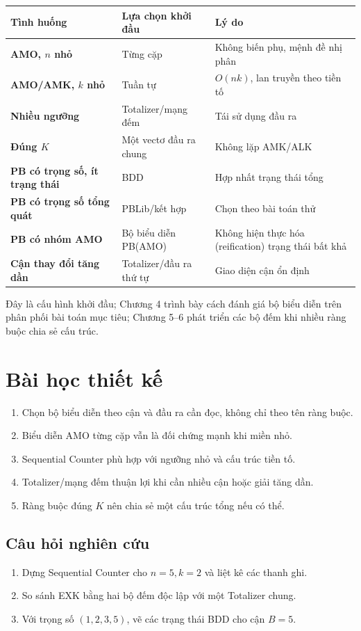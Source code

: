 \begin{center}
\label{tab:cardinality-choice}
\begin{tabularx}{\textwidth}{@{}>{\bfseries\sffamily}p{}YY@{}}
\toprule
Tình huống & Lựa chọn khởi đầu & Lý do\\
\midrule
AMO, \(n\) nhỏ & Từng cặp & Không biến phụ, mệnh đề nhị phân\\
AMO/AMK, \(k\) nhỏ & Tuần tự & \(O(nk)\), lan truyền theo tiền tố\\
Nhiều ngưỡng & Totalizer/mạng đếm & Tái sử dụng đầu ra\\
Đúng \(K\) & Một vectơ đầu ra chung & Không lặp AMK/ALK\\
PB có trọng số, ít trạng thái & BDD & Hợp nhất trạng thái tổng\\
PB có trọng số tổng quát & PBLib/kết hợp & Chọn theo bài toán thử\\
PB có nhóm AMO & Bộ biểu diễn PB(AMO) & Không hiện thực hóa (reification) trạng thái bất khả\\
Cận thay đổi tăng dần & Totalizer/đầu ra thứ tự & Giao diện cận ổn định\\
\bottomrule
\end{tabularx}
\end{center}

Đây là cấu hình khởi đầu; Chương 4 trình bày cách đánh giá bộ biểu diễn trên phân
phối bài toán mục tiêu; Chương 5--6 phát triển các bộ đếm khi nhiều
ràng buộc chia sẻ cấu trúc.

\section{Bài học thiết kế}

\begin{enumerate}
  \item Chọn bộ biểu diễn theo cận và đầu ra cần đọc, không chỉ theo tên ràng buộc.
  \item Biểu diễn AMO từng cặp vẫn là đối chứng mạnh khi miền nhỏ.
  \item Sequential Counter phù hợp với ngưỡng nhỏ và cấu trúc tiền tố.
  \item Totalizer/mạng đếm thuận lợi khi cần nhiều cận hoặc giải tăng dần.
  \item Ràng buộc đúng \(K\) nên chia sẻ một cấu trúc tổng nếu có thể.
\end{enumerate}

\subsection*{Câu hỏi nghiên cứu}
\begin{enumerate}
  \item Dựng Sequential Counter cho \(n=5,k=2\) và liệt kê các thanh ghi.
  \item So sánh EXK bằng hai bộ đếm độc lập với một Totalizer chung.
  \item Với trọng số \((1,2,3,5)\), vẽ các trạng thái BDD cho cận \(B=5\).
\end{enumerate}
